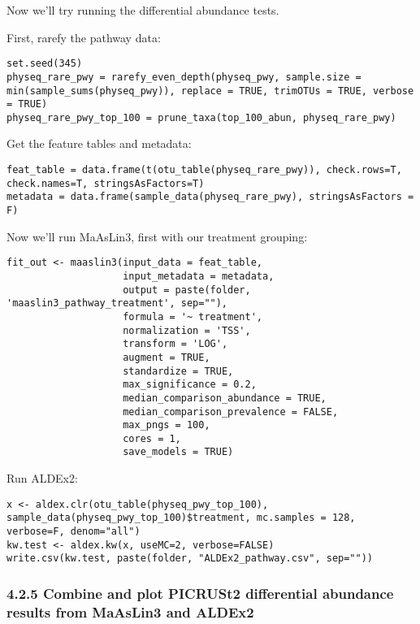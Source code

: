 \documentclass[
]{book}
\begin{document}
Now we'll try running the differential abundance tests.

First, rarefy the pathway data:

\begin{verbatim}
set.seed(345)
physeq_rare_pwy = rarefy_even_depth(physeq_pwy, sample.size = min(sample_sums(physeq_pwy)), replace = TRUE, trimOTUs = TRUE, verbose = TRUE)
physeq_rare_pwy_top_100 = prune_taxa(top_100_abun, physeq_rare_pwy)
\end{verbatim}

Get the feature tables and metadata:

\begin{verbatim}
feat_table = data.frame(t(otu_table(physeq_rare_pwy)), check.rows=T, check.names=T, stringsAsFactors=T)
metadata = data.frame(sample_data(physeq_rare_pwy), stringsAsFactors = F)
\end{verbatim}

Now we'll run MaAsLin3, first with our treatment grouping:

\begin{verbatim}
fit_out <- maaslin3(input_data = feat_table,
                    input_metadata = metadata,
                    output = paste(folder, 'maaslin3_pathway_treatment', sep=""),
                    formula = '~ treatment',
                    normalization = 'TSS',
                    transform = 'LOG',
                    augment = TRUE,
                    standardize = TRUE,
                    max_significance = 0.2,
                    median_comparison_abundance = TRUE,
                    median_comparison_prevalence = FALSE,
                    max_pngs = 100,
                    cores = 1,
                    save_models = TRUE)
\end{verbatim}

Run ALDEx2:

\begin{verbatim}
x <- aldex.clr(otu_table(physeq_pwy_top_100), sample_data(physeq_pwy_top_100)$treatment, mc.samples = 128, verbose=F, denom="all")
kw.test <- aldex.kw(x, useMC=2, verbose=FALSE)
write.csv(kw.test, paste(folder, "ALDEx2_pathway.csv", sep=""))
\end{verbatim}

\subsubsection{4.2.5 Combine and plot PICRUSt2 differential abundance results from MaAsLin3 and ALDEx2}\label{combine-and-plot-picrust2-differential-abundance-results-from-maaslin3-and-aldex2}
\end{document}
